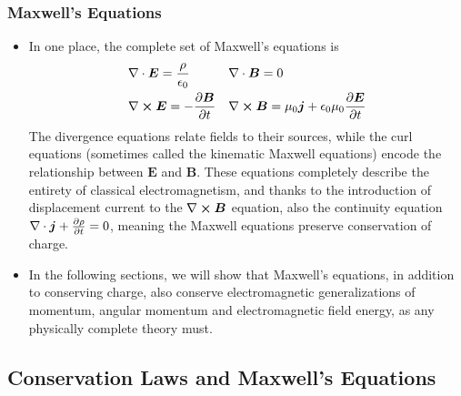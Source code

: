 \documentclass[11pt, a4paper]{article}
\renewcommand{\vec}[1]{\bm{#1}} %
\newcommand{\E}{\vec{E}} %
\newcommand{\B}{\vec{B}} %
\newcommand{\ee}{\epsilon_{0}}  %
\newcommand{\mm}{\mu_{0}}  %
\renewcommand{\j}{\vec{j}}  %
\renewcommand{\div}{\nabla \cdot}
\renewcommand{\curl}{\nabla \cross}
\begin{document}
\subsubsection{Maxwell's Equations}
\begin{itemize}
	\item In one place, the complete set of Maxwell's equations is
	\begin{align*}
		& \div \E = \frac{\rho}{\ee} && \div \B = 0\\
		& \curl \E = - \pdv{\B}{t} && \curl \B = \mm \j + \ee \mm \pdv{\E}{t}
	\end{align*}
	The divergence equations relate fields to their sources, while the curl equations (sometimes called the kinematic Maxwell equations) encode the relationship between $ \E $ and $ \B $. These equations completely describe the entirety of classical electromagnetism, and thanks to the introduction of displacement current to the $ \curl \B $ equation, also the continuity equation $ \div \j + \pdv{\rho}{t} = 0 $, meaning the Maxwell equations preserve conservation of charge.
	
	
	\item In the following sections, we will show that Maxwell's equations, in addition to conserving charge, also conserve electromagnetic generalizations of momentum, angular momentum and electromagnetic field energy, as any physically complete theory must.
\end{itemize}

\subsection{Conservation Laws and Maxwell's Equations}
\end{document}
